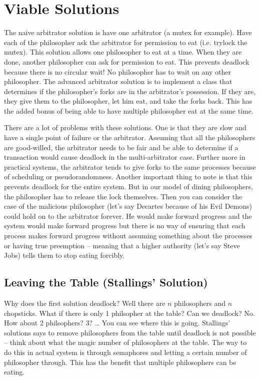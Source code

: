 \section{Viable Solutions}

The naive arbitrator solution is have one arbitrator (a mutex for example). Have each of the philosopher ask the arbitrator for permission to eat (i.e. trylock the mutex). This solution allows one philosopher to eat at a time. When they are done, another philosopher can ask for permission to eat. This prevents deadlock because there is no circular wait! No philosopher has to wait on any other philosopher. The advanced arbitrator solution is to implement a class that determines if the philosopher's forks are in the arbitrator's possession. If they are, they give them to the philosopher, let him eat, and take the forks back. This has the added bonus of being able to have multiple philosopher eat at the same time.

There are a lot of problems with these solutions. One is that they are slow and have a single point of failure or the arbitrator. Assuming that all the philosophers are good-willed, the arbitrator needs to be fair and be able to determine if a transaction would cause deadlock in the multi-arbitrator case. Further more in practical systems, the arbitrator tends to give forks to the same processes because of scheduling or pseudorandomness. Another important thing to note is that this prevents deadlock for the entire system. But in our model of dining philosophers, the philosopher has to release the lock themselves. Then you can consider the case of the malicious philosopher (let's say Decartes because of his Evil Demons) could hold on to the arbitrator forever. He would make forward progress and the system would make forward progress but there is no way of ensuring that each process makes forward progress without assuming something about the processes or having true preemption -- meaning that a higher authority (let's say Steve Jobs) tells them to stop eating forcibly.


\subsection{Leaving the Table (Stallings' Solution)}

Why does the first solution deadlock? Well there are $n$ philosophers and $n$ chopsticks. What if there is only 1 philsopher at the table? Can we deadlock? No. How about 2 philsophers? 3? \ldots{} You can see where this is going. Stallings' \cite[P. 280]{stalling} solutions says to remove philosophers from the table until deadlock is not possible -- think about what the magic number of philosophers at the table. The way to do this in actual system is through semaphores and letting a certain number of philosopher through. This has the benefit that multiple philosophers can be eating.


